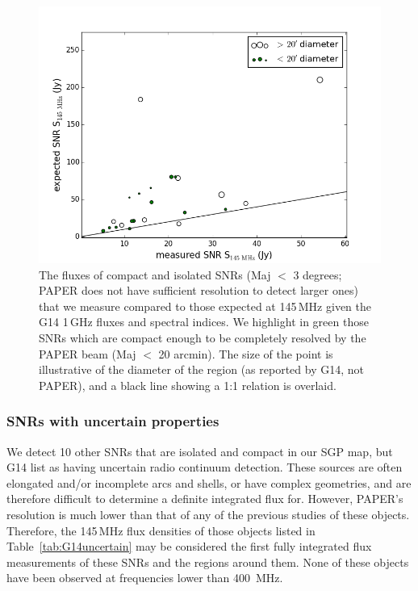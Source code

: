 \documentclass[useAMS,usenatbib]{mn2e}
\begin{document}
\begin{figure}
\centering
\includegraphics[width=\columnwidth]{figs/GreenScatter.png}
\caption{The fluxes of compact and isolated SNRs (Maj $<$ 3 degrees; PAPER does not have sufficient resolution to detect larger ones) that we measure compared to those expected at 145\,MHz given the G14 1\,GHz fluxes and spectral indices. We highlight in green those SNRs which are compact enough to be completely resolved by the PAPER beam (Maj $<$ 20 arcmin). The size of the point is illustrative of the diameter of the region (as reported by G14, not PAPER), and a black line showing a 1:1 relation is overlaid.}
\label{fig:comparisonscatterSNR}
\end{figure}

\subsubsection{SNRs with uncertain properties}

We detect 10 other SNRs that are isolated and compact in our SGP map, but G14 list as having uncertain radio continuum detection. These sources are often elongated and/or incomplete arcs and shells, or have complex geometries, and are therefore difficult to determine a definite integrated flux for. However, PAPER's resolution is much lower than that of any of the previous studies of these objects. Therefore, the 145\,MHz flux densities of those objects listed in Table~\ref{tab:G14uncertain} may be considered the first fully integrated flux measurements of these SNRs and the regions around them. None of these objects have been observed at frequencies lower than 400\, MHz.
\end{document}

